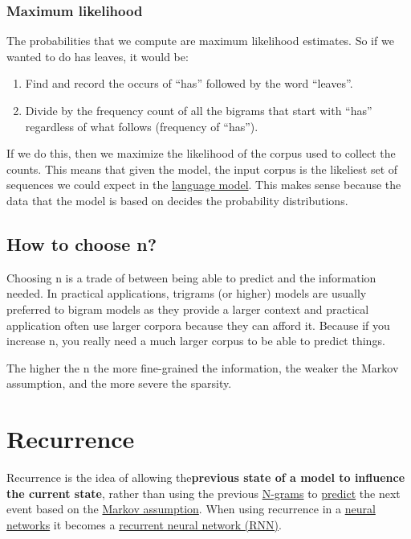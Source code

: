 \documentclass[
  11pt,
  british,
]{article}
\providecommand{\tightlist}{%
  \setlength{\itemsep}{0pt}\setlength{\parskip}{0pt}}
\begin{document}
\hypertarget{maximum-likelihood}{%
\subsubsection{Maximum likelihood}\label{maximum-likelihood}}

The probabilities that we compute are maximum likelihood estimates. So
if we wanted to do has leaves, it would be:

\begin{enumerate}
\def\labelenumi{\arabic{enumi}.}
\tightlist
\item
  Find and record the occurs of ``has'' followed by the word ``leaves''.
\item
  Divide by the frequency count of all the bigrams that start with
  ``has'' regardless of what follows (frequency of ``has'').
\end{enumerate}

If we do this, then we maximize the likelihood of the corpus used to
collect the counts. This means that given the model, the input corpus is
the likeliest set of sequences we could expect in the
\href{Language\%20Modeling.md}{language model}. This makes sense because
the data that the model is based on decides the probability
distributions.

\hypertarget{how-to-choose-n}{%
\subsection{How to choose n?}\label{how-to-choose-n}}

Choosing n is a trade of between being able to predict and the
information needed. In practical applications, trigrams (or higher)
models are usually preferred to bigram models as they provide a larger
context and practical application often use larger corpora because they
can afford it. Because if you increase n, you really need a much larger
corpus to be able to predict things.

The higher the n the more fine-grained the information, the weaker the
Markov assumption, and the more severe the sparsity.

\hypertarget{recurrence}{%
\section{Recurrence}\label{recurrence}}

Recurrence is the idea of allowing the\textbf{previous state of a model
to influence the current state}, rather than using the previous
\href{../Languages/N-grams.md}{N-grams} to
\href{../Prediction/Prediction.md}{predict} the next event based on the
\href{Markov\%20assumption.md}{Markov assumption}. When using recurrence
in a \href{Feed\%20forward\%20neural\%20networks\%20(FFNN).md}{neural
networks} it becomes a
\href{../Prediction/Recurrent\%20neural\%20network\%20(RNN).md}{recurrent
neural network (RNN)}.
\end{document}
